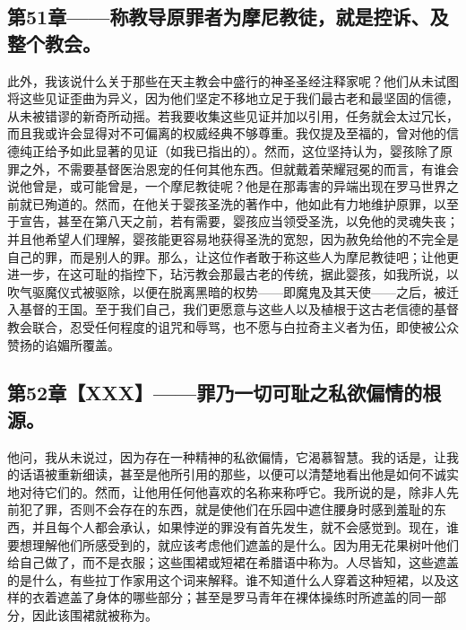 
\subsection{第51章——称教导原罪者为摩尼教徒，就是控诉、及整个教会。}

此外，我该说什么关于那些在天主教会中盛行的神圣圣经注释家呢？他们从未试图将这些见证歪曲为异义，因为他们坚定不移地立足于我们最古老和最坚固的信德，从未被错谬的新奇所动摇。若我要收集这些见证并加以引用，任务就会太过冗长，而且我或许会显得对不可偏离的权威经典不够尊重。我仅提及至福的，曾对他的信德纯正给予如此显著的见证（如我已指出的）。然而，这位坚持认为，婴孩除了原罪之外，不需要基督医治恩宠的任何其他东西。但就戴着荣耀冠冕的而言，有谁会说他曾是，或可能曾是，一个摩尼教徒呢？他是在那毒害的异端出现在罗马世界之前就已殉道的。然而，在他关于婴孩圣洗的著作中，他如此有力地维护原罪，以至于宣告，甚至在第八天之前，若有需要，婴孩应当领受圣洗，以免他的灵魂失丧；并且他希望人们理解，婴孩能更容易地获得圣洗的宽恕，因为赦免给他的不完全是自己的罪，而是别人的罪。那么，让这位作者敢于称这些人为摩尼教徒吧；让他更进一步，在这可耻的指控下，玷污教会那最古老的传统，据此婴孩，如我所说，以吹气驱魔仪式被驱除，以便在脱离黑暗的权势——即魔鬼及其天使——之后，被迁入基督的王国。至于我们自己，我们更愿意与这些人以及植根于这古老信德的基督教会联合，忍受任何程度的诅咒和辱骂，也不愿与白拉奇主义者为伍，即使被公众赞扬的谄媚所覆盖。\par


\subsection{第52章【XXX】——罪乃一切可耻之私欲偏情的根源。}

他问，我从未说过，因为存在一种精神的私欲偏情，它渴慕智慧。我的话是，让我的话语被重新细读，甚至是他所引用的那些，以便可以清楚地看出他是如何不诚实地对待它们的。然而，让他用任何他喜欢的名称来称呼它。我所说的是，除非人先前犯了罪，否则不会存在的东西，就是使他们在乐园中遮住腰身时感到羞耻的东西，并且每个人都会承认，如果悖逆的罪没有首先发生，就不会感觉到。现在，谁要想理解他们所感受到的，就应该考虑他们遮盖的是什么。因为用无花果树叶他们给自己做了，而不是衣服；这些围裙或短裙在希腊语中称为。人尽皆知，这些遮盖的是什么，有些拉丁作家用这个词来解释。谁不知道什么人穿着这种短裙，以及这样的衣着遮盖了身体的哪些部分；甚至是罗马青年在裸体操练时所遮盖的同一部分，因此该围裙就被称为。\par


